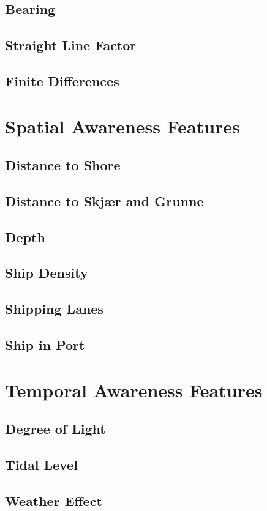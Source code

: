 \subsection{Bearing}
\subsection{Straight Line Factor}
\subsection{Finite Differences}

\section{Spatial Awareness Features}
\begin{info}{}
\end{info}
\subsection{Distance to Shore}
\subsection{Distance to Skjær and Grunne}
\subsection{Depth}
\subsection{Ship Density}
\subsection{Shipping Lanes}
\subsection{Ship in Port}
\section{Temporal Awareness Features}
\subsection{Degree of Light}
\subsection{Tidal Level}
\subsection{Weather Effect}
\begin{info}{}
\end{info}



